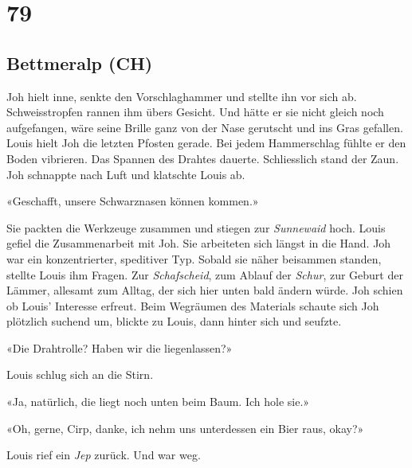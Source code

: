\chapter{79}

\section{Bettmeralp (CH)} 



Joh hielt inne, senkte den Vorschlaghammer und stellte ihn vor sich ab.
Schweisstropfen rannen ihm übers Gesicht. Und hätte er sie nicht gleich
noch aufgefangen, wäre seine Brille ganz von der Nase gerutscht und ins Gras
gefallen. Louis hielt Joh die letzten Pfosten gerade. Bei jedem
Hammerschlag fühlte er den Boden vibrieren. Das Spannen des Drahtes
dauerte. Schliesslich stand der Zaun.
Joh schnappte nach Luft und klatschte Louis ab.

«Geschafft, unsere Schwarznasen können kommen.»

Sie packten die Werkzeuge zusammen und stiegen zur \emph{Sunnewaid}
hoch. Louis gefiel die Zusammenarbeit mit Joh. Sie arbeiteten sich
längst in die Hand. Joh war ein konzentrierter, speditiver Typ.
Sobald sie näher beisammen standen, stellte Louis ihm Fragen. Zur
\emph{Schafscheid}, zum Ablauf der \emph{Schur}, zur Geburt der Lämmer,
allesamt zum Alltag, der sich hier unten bald ändern würde. Joh schien
ob Louis’ Interesse erfreut.
Beim Wegräumen des Materials schaute sich Joh plötzlich suchend um, 
blickte zu Louis, dann hinter sich und seufzte.

«Die Drahtrolle? Haben wir die liegenlassen?»

Louis schlug sich an die Stirn.

«Ja, natürlich, die liegt noch unten beim Baum. Ich hole sie.»

«Oh, gerne, Cirp, danke, ich nehm uns unterdessen ein Bier raus, okay?»

Louis rief ein \emph{Jep} zurück. Und war weg.


